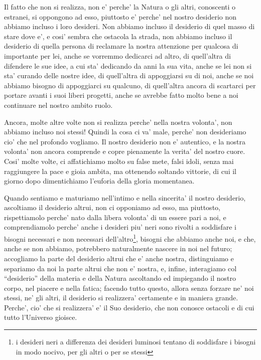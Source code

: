 Il fatto che non si realizza, non e' perche' la Natura o gli altri, conoscenti o estranei, si oppongono ad esso, piuttosto e' perche' nel nostro desiderio non abbiamo incluso i loro desideri. Non abbiamo incluso il desiderio di quel masso di stare dove e', e cosi' sembra che ostacola la strada, non abbiamo incluso il desiderio di quella persona di reclamare la nostra attenzione per qualcosa di importante per lei, anche se vorremmo dedicarci ad altro, di quell'altra di difendere le sue idee, a cui sta' dedicando da anni la sua vita, anche se lei non si sta' curando delle nostre idee, di quell'altra di appoggiarsi su di noi, anche se noi abbiamo bisogno di appoggiarci su qualcuno, di quell'altra ancora di scartarci per portare avanti i suoi liberi progetti, anche se avrebbe fatto molto bene a noi continuare nel nostro ambito ruolo.

Ancora, molte altre volte non si realizza perche' nella nostra volonta', non abbiamo incluso noi stessi! Quindi la cosa ci va' male, perche' non desideriamo cio' che nel profondo vogliamo. Il nostro desiderio non e' autentico, e la nostra volonta' non ancora comprende e copre pienamente la verita' del nostro cuore. Cosi' molte volte, ci affatichiamo molto su false mete, falsi idoli, senza mai raggiungere la pace e gioia ambita, ma ottenendo soltando vittorie, di cui il giorno dopo dimentichiamo l'euforia della gloria momentanea.

Quando sentiamo e maturiamo nell'intimo e nella sincerita' il nostro desiderio, ascoltiamo il desiderio altrui, non ci opponiamo ad esso, ma piuttosto, rispettiamolo perche' nato dalla libera volonta' di un essere pari a noi, e comprendiamolo perche' anche i desideri piu' neri sono rivolti a soddisfare i bisogni necessari e non necessari dell'altro\footnote{i desideri neri a differenza dei desideri luminosi tentano di soddisfare i bisogni in modo nocivo, per gli altri o per se stessi}, bisogni che abbiamo anche noi, e che, anche se non abbiamo, potrebbero naturalmente nascere in noi nel futuro; accogliamo la parte del desiderio altrui che e' anche nostra, distinguiamo e separiamo da noi la parte altrui che non e' nostra, e, infine, interagiamo col ``desiderio'' della materia e della Natura ascoltando ed impiegando il nostro corpo, nel piacere e nella fatica; facendo tutto questo, allora senza forzare ne' noi stessi, ne' gli altri, il desiderio si realizzera' certamente e in maniera grande. Perche', cio' che si realizzera' e' il Suo desiderio, che non conosce ostacoli e di cui tutto l'Universo gioisce. 

